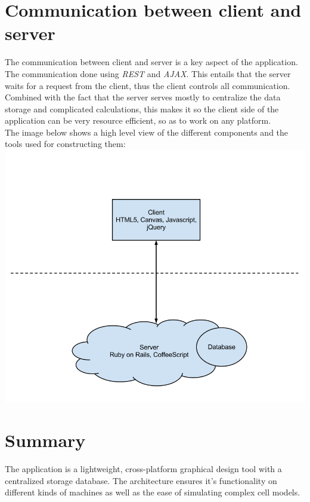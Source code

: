 \documentclass{report}
\begin{document}
	\section{Communication between client and server}
		The communication between client and server is a key aspect of the application. The communication done using \emph{REST} and \emph{AJAX}. This entails that the server waits for a request from the client, thus the client controls all communication. Combined with the fact that the server serves mostly to centralize the data storage and complicated calculations, this makes it so the client side of the application can be very resource efficient, so as to work on any platform.\\
		The image below shows a high level view of the different components and the tools used for constructing them:\\
		\includegraphics[width=16cm]{EAD.png}
	\clearpage
	\section{Summary}
		The application is a lightweight, cross-platform graphical design tool with a centralized storage database. The architecture ensures it's functionality on different kinds of machines as well as the ease of simulating complex cell models.
\end{document}
